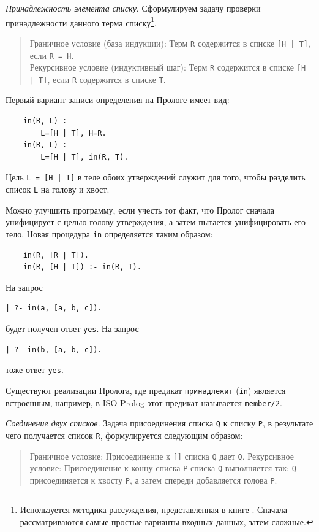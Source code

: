 \documentclass[12pt, openany, twoside]{book} %
\begin{document}
\emph{Принадлежность элемента списку}. Сформулируем задачу проверки принадлежности данного терма списку\footnote{Используется методика рассуждения, представленная в книге \cite{Bratko}. Сначала рассматриваются самые простые варианты входных данных, затем сложные.}.

\begin{quote}
\noindent Граничное условие (база индукции): Терм {\tt R} содержится в списке {\tt [H | T]}, если {\tt R = H}.\\
Рекурсивное условие (индуктивный шаг): Терм {\tt R} содержится в списке {\tt [H | T]}, если {\tt R}
содержится в списке {\tt Т}.
\end{quote}

\noindent Первый вариант записи определения на Прологе имеет вид:
{\tt\begin{verbatim}
    in(R, L) :-
        L=[H | T], H=R.
    in(R, L) :-
        L=[H | T], in(R, T).
\end{verbatim}}

\noindent Цель {\tt L = [H | T]} в теле обоих утверждений служит для того, чтобы разделить список {\tt L} на голову и хвост.

Можно улучшить программу, если учесть тот факт, что Пролог сначала унифицирует с целью голову утверждения, а затем пытается унифицировать его тело. Новая процедура {\tt in} определяется таким образом:
{\tt\begin{verbatim}
    in(R, [R | Т]).
    in(R, [H | Т]) :- in(R, T).
\end{verbatim}}

\noindent На запрос
{\tt\begin{verbatim}
| ?- in(а, [а, b, с]).
\end{verbatim}}
\noindent будет получен ответ {\tt yes}.
\noindent На запрос
{\tt\begin{verbatim}
| ?- in(b, [a, b, с]).
\end{verbatim}}
\noindent тоже ответ {\tt yes}.

Существуют реализации Пролога, где предикат {\tt принадлежит} ({\tt in}) является встроенным, например, в ISO-Prolog этот предикат называется \texttt{member/2}.

\emph{Соединение двух списков}. Задача присоединения списка {\tt Q} к списку {\tt Р}, в результате чего получается список {\tt R}, формулируется следующим образом:
\begin{quote}
\noindent Граничное условие: Присоединение к {\tt []} списка {\tt Q} дает {\tt Q}.
\noindent Рекурсивное условие: Присоединение к концу списка {\tt Р} списка {\tt Q} выполняется так: {\tt Q} присоединяется к хвосту {\tt Р}, а затем спереди добавляется голова {\tt Р}.
\end{quote}
\end{document}
